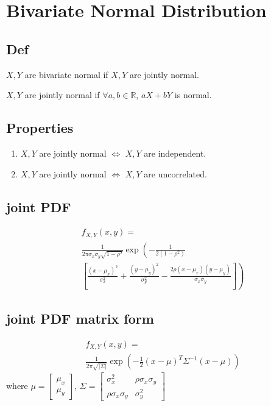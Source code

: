 \section{Bivariate Normal Distribution}
    \subsection*{Def}
        $X, Y$ are bivariate normal if $X, Y$ are jointly normal.

        $X, Y$ are jointly normal if $\forall a, b \in \mathbb{R}$, $aX+bY$ is normal.



    \subsection*{Properties}
        \begin{enumerate}
            \item $X, Y$ are jointly normal $\iff$ $X, Y$ are independent.
            \item $X, Y$ are jointly normal $\iff$ $X, Y$ are uncorrelated.
        \end{enumerate}

    \subsection*{joint PDF}
        \[
        \begin{split}
            &f_{X,Y}(x,y) = \\
            &\frac{1}{2\pi\sigma_x\sigma_y\sqrt{1-\rho^2}}\exp\left(-\frac{1}{2(1-\rho^2)}\right.\\
            &\left.\left[\frac{(x-\mu_x)^2}{\sigma_x^2}+\frac{(y-\mu_y)^2}{\sigma_y^2}-\frac{2\rho(x-\mu_x)(y-\mu_y)}{\sigma_x\sigma_y}\right]\right)
        \end{split}
        \]
    
    \subsection*{joint PDF matrix form}
        \[
        \begin{split}
            &f_{X,Y}(x,y) = \\
            &\frac{1}{2\pi\sqrt{|\Sigma|}}\exp\left(-\frac{1}{2}(x-\mu)^T\Sigma^{-1}(x-\mu)\right)
        \end{split}
        \]
        where $\mu = \begin{bmatrix}\mu_x\\\mu_y\end{bmatrix}$, $\Sigma = \begin{bmatrix}\sigma_x^2 & \rho\sigma_x\sigma_y\\\rho\sigma_x\sigma_y & \sigma_y^2\end{bmatrix}$


